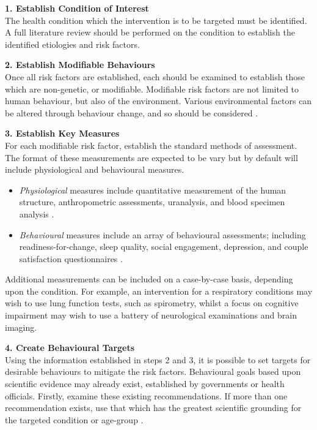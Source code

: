 \textbf{1. Establish Condition of Interest} \\
The health condition which the intervention is to be targeted must be identified. A full literature review should be performed on the condition to establish the identified etiologies and risk factors.

\textbf{2. Establish Modifiable Behaviours} \\
Once all risk factors are established, each should be examined to establish those which are non-genetic, or modifiable. Modifiable risk factors are not limited to human behaviour, but also of the environment. Various environmental factors can be altered through behaviour change, and so should be considered \cite{Kujala2002}.

\textbf{3. Establish Key Measures}\\
For each modifiable risk factor, establish the standard methods of assessment. The format of these measurements are expected to be vary but by default will include physiological and behavioural measures.
\begin{itemize}[noitemsep,topsep=0pt]
\item \emph{Physiological} measures include quantitative measurement of the human structure, anthropometric assessments, uranalysis, and blood specimen analysis \cite{Oberg2014}.
\item \emph{Behavioural} measures include an array of behavioural assessments; including readiness-for-change, sleep quality, social engagement, depression, and couple satisfaction questionnaires  \cite{Martin2007}.
\end{itemize}

Additional measurements can be included on a case-by-case basis, depending upon the condition. For example, an intervention for a respiratory conditions may wish to use lung function tests, such as spirometry, whilst a focus on cognitive impairment may wish to use a battery of neurological examinations and brain imaging.

\textbf{4. Create Behavioural Targets} \\
Using the information established in steps 2 and 3, it is possible to set targets for desirable behaviours to mitigate the risk factors. Behavioural goals based upon scientific evidence may already exist, established by governments or health officials. Firstly, examine these existing recommendations. If more than one recommendation exists, use that which has the greatest scientific grounding for the targeted condition or age-group \cite{Stover2002, Pronk2004}.

